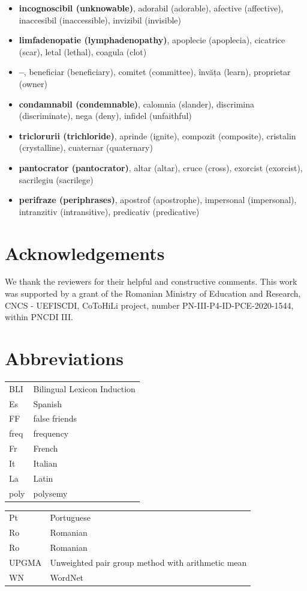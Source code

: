 \documentclass[output=paper]{langsci/langscibook}
\begin{document}
\begin{itemize}[leftmargin=*]
\begin{itemize}
		\item \textbf{incognoscibil (unknowable)}, adorabil (adorable), afective (affective), inaccesibil (inaccessible), invizibil (invisible)
		\item \textbf{limfadenopatie (lymphadenopathy)}, apoplecie (apoplecia), cicatrice (scar), letal (lethal), coagula (clot)
		\item \textbf{--}, beneficiar (beneficiary), comitet (committee), învăța (learn), proprietar (owner)
		\item \textbf{condamnabil (condemnable)}, calomnia (slander), discrimina (discriminate), nega (deny), infidel (unfaithful)
		\item \textbf{triclorurii (trichloride)}, aprinde (ignite), compozit (composite), cristalin (crystalline), cuaternar (quaternary)
		\item \textbf{pantocrator (pantocrator)}, altar (altar), cruce (cross), exorcist (exorcist), sacrilegiu (sacrilege)
		\item \textbf{perifraze (periphrases)}, apostrof (apostrophe), impersonal (impersonal), intranzitiv (intransitive), predicativ (predicative)
	\end{itemize}
\end{itemize}
 
 
\section*{Acknowledgements}
\begin{sloppypar}
We thank the reviewers for their helpful and constructive comments.
This work was supported by a grant of the Romanian Ministry of Education and Research, CNCS - UEFISCDI,  CoToHiLi project, number PN-III-P4-ID-PCE-2020-1544, within PNCDI III.
\end{sloppypar}

\section*{Abbreviations}
\begin{tabularx}{.5\textwidth}[t]{@{}lQ@{}}
BLI & Bilingual Lexicon Induction \\
Es & Spanish \\
FF & false friends \\
freq & frequency \\
Fr & French \\
It & Italian \\
La & Latin \\
poly & polysemy\\
\end{tabularx}\begin{tabularx}{.5\textwidth}[t]{@{}lQ@{}}
Pt & Portuguese \\
Ro & Romanian \\
Ro & Romanian \\
UPGMA & Unweighted pair group method with arithmetic mean \\
WN & WordNet \\
\end{tabularx}

{\sloppy\printbibliography[heading=subbibliography,notkeyword=this]}
\end{document}
